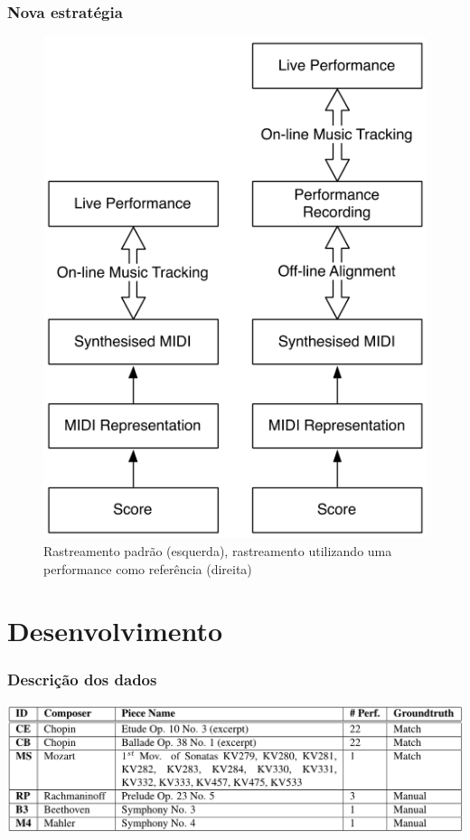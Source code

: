\documentclass[serif,mathserif]{beamer}
\begin{document}
\begin{frame}[label=figura1]
  \frametitle{Nova estratégia}
  \begin{figure}[!ht]
    \centering
    \includegraphics[height=0.7\textheight]{src/img/2-Figure1-1.png}
    \caption*{Rastreamento padrão (esquerda), rastreamento utilizando uma performance como referência (direita)}
  \end{figure}
\end{frame}


\section{Desenvolvimento}
\begin{frame}
  \frametitle{Descrição dos dados}
  \pause
  \begin{center}
    \includegraphics[width=\textwidth]{src/img/1-Table1-1.png}
  \end{center}
\end{frame}
\end{document}
